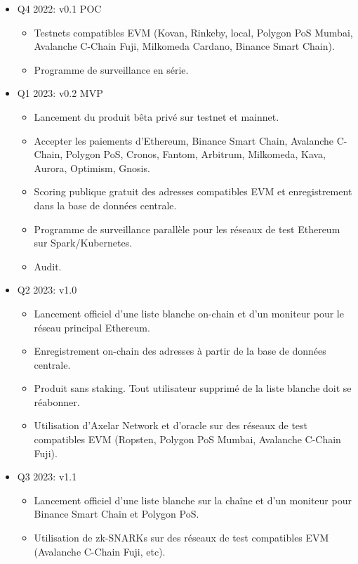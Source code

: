 ﻿\documentclass[a4paper]{article}
\begin{document}
\begin{itemize}
\item
Q4 2022:  v0.1 POC
    \begin{itemize}
    \item Testnets compatibles EVM (Kovan, Rinkeby, local, Polygon PoS Mumbai, Avalanche C-Chain Fuji, Milkomeda Cardano, Binance Smart Chain). 
    \item Programme de surveillance en série. 
    \end{itemize}

\item
Q1 2023: v0.2 MVP
    \begin{itemize}
    \item Lancement du produit bêta privé sur testnet et mainnet.
    \item Accepter les paiements d'Ethereum, Binance Smart Chain, Avalanche C-Chain, Polygon PoS, Cronos, Fantom, Arbitrum, Milkomeda, Kava, Aurora, Optimism, Gnosis. 
    \item Scoring publique gratuit des adresses compatibles EVM et enregistrement dans la base de données centrale.
    \item Programme de surveillance parallèle pour les r\'eseaux de test Ethereum sur Spark/Kubernetes.
    \item Audit.
    \end{itemize}

\item
Q2 2023: v1.0
    \begin{itemize}
    \item Lancement officiel d'une liste blanche on-chain et d'un moniteur pour le réseau principal Ethereum.
    \item Enregistrement on-chain des adresses à partir de la base de données centrale.
    \item Produit sans staking. Tout utilisateur supprimé de la liste blanche doit se réabonner.
    \item Utilisation d'Axelar Network et d'oracle sur des réseaux de test compatibles EVM (Ropsten, Polygon PoS Mumbai, Avalanche C-Chain Fuji).
    \end{itemize}

\item
Q3 2023: v1.1
    \begin{itemize}
    \item Lancement officiel d'une liste blanche sur la chaîne et d'un moniteur pour Binance Smart Chain et Polygon PoS.
    \item Utilisation de zk-SNARKs sur des réseaux de test compatibles EVM (Avalanche C-Chain Fuji, etc). 
    \end{itemize}


\end{itemize}
\end{document}
